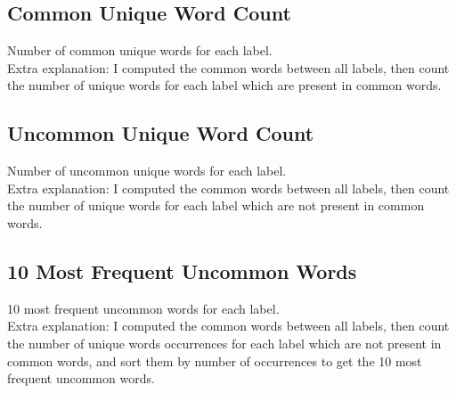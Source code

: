 \subsection{Common Unique Word Count}
Number of common unique words for each label. \\
Extra explanation: I computed the common words between all labels, then count the number of unique words for each label which are present in common words. \\
\begin{center}
	\begin{adjustbox}{max width=\textwidth}
	\end{adjustbox}
\end{center}

\subsection{Uncommon Unique Word Count}
Number of uncommon unique words for each label.  \\
Extra explanation: I computed the common words between all labels, then count the number of unique words for each label which are not present in common words.  \\
\begin{center}
	\begin{adjustbox}{max width=\textwidth}
	\end{adjustbox}
\end{center}

\subsection{10 Most Frequent Uncommon Words}
10 most frequent uncommon words for each label.  \\
Extra explanation: I computed the common words between all labels, then count the number of unique words occurrences for each label which are not present in common words, and sort them by number of occurrences to get the 10 most frequent uncommon words.  \\
\begin{center}
	\begin{adjustbox}{max width=\textwidth}
	\end{adjustbox}
\end{center}

